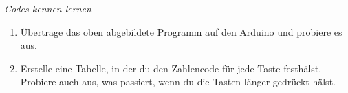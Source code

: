 
\begin{aufgabe} \emph{Codes kennen lernen}
	\begin{enumerate}[label=\alph*),itemsep=0mm,parsep=0mm]
		\item Übertrage das oben abgebildete Programm auf den Arduino und probiere es aus.
		\item Erstelle eine Tabelle, in der du den Zahlencode für jede Taste festhälst. Probiere auch aus, was passiert, wenn du die Tasten länger gedrückt hälst.
	\end{enumerate}
\end{aufgabe}

